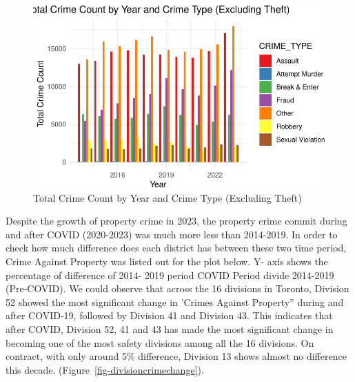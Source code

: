 \documentclass[
  letterpaper,
  DIV=11,
  numbers=noendperiod]{scrartcl}
\begin{document}
\begin{figure}

{\centering \includegraphics{paper_files/figure-pdf/fig-crime_type_notheft-1.pdf}

}

\caption{\label{fig-crime_type_notheft}Total Crime Count by Year and
Crime Type (Excluding Theft)}

\end{figure}

Despite the growth of property crime in 2023, the property crime commit
during and after COVID (2020-2023) was much more less than 2014-2019. In
order to check how much difference does each district has between these
two time period, Crime Against Property was listed out for the plot
below. Y- axis shows the percentage of difference of 2014- 2019 period
COVID Period divide 2014-2019 (Pre-COVID). We could observe that across
the 16 divisions in Toronto, Division 52 showed the most significant
change in 'Crimes Against Property'' during and after COVID-19, followed
by Division 41 and Division 43. This indicates that after COVID,
Division 52, 41 and 43 has made the most significant change in becoming
one of the most safety divisions among all the 16 divisions. On
contract, with only around 5\% difference, Division 13 shows almost no
difference this decade. (Figure~\ref{fig-divisioncrimechange}).
\end{document}
